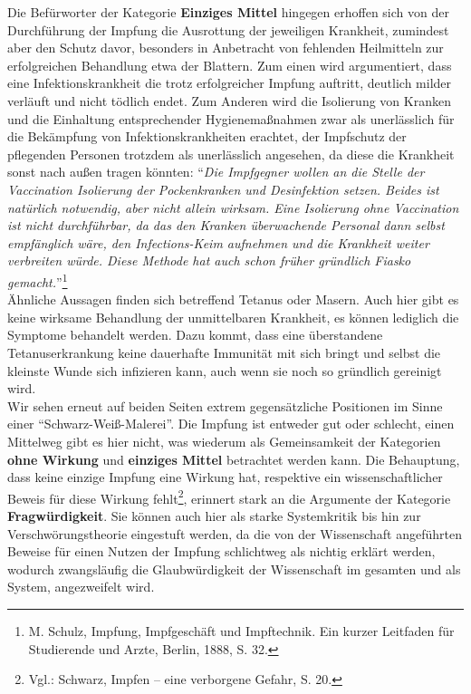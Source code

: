 \documentclass[
    a4paper,
    12pt,
    hyphens,
    chapterprefix=true,
    headheight=33pt,
    footheight=29pt,
    headings=optiontohead,
]{scrartcl}
\begin{document}
{Die Befürworter der Kategorie \textbf{Einziges Mittel} hingegen erhoffen sich von der Durchführung der Impfung die Ausrottung der jeweiligen Krankheit, zumindest aber den Schutz davor, besonders in Anbetracht von fehlenden Heilmitteln zur erfolgreichen Behandlung etwa der Blattern. Zum einen wird argumentiert, dass eine Infektionskrankheit die trotz erfolgreicher Impfung auftritt, deutlich milder verläuft und nicht tödlich endet. Zum Anderen wird die Isolierung von Kranken und die Einhaltung entsprechender Hygienemaßnahmen zwar als unerlässlich für die Bekämpfung von Infektionskrankheiten erachtet, der Impfschutz der pflegenden Personen trotzdem als unerlässlich angesehen, da diese die Krankheit sonst nach außen tragen könnten: "`\textit{Die Impfgegner wollen an die Stelle der Vaccination Isolierung der Pockenkranken und Desinfektion setzen. Beides ist natürlich notwendig, aber nicht allein wirksam. Eine Isolierung ohne Vaccination ist nicht durchführbar, da das den Kranken überwachende Personal dann selbst empfänglich wäre, den Infections-Keim aufnehmen und die Krankheit weiter verbreiten würde. Diese Methode hat auch schon früher gründlich Fiasko gemacht.}"'\footnote{M. Schulz, Impfung, Impfgeschäft und Impftechnik. Ein kurzer Leitfaden für Studierende und Arzte, Berlin, 1888, S. 32.}\\
Ähnliche Aussagen finden sich betreffend Tetanus oder Masern. Auch hier gibt es keine wirksame Behandlung der unmittelbaren Krankheit, es können lediglich die Symptome behandelt werden. Dazu kommt, dass eine überstandene Tetanuserkrankung keine dauerhafte Immunität mit sich bringt und selbst die kleinste Wunde sich infizieren kann, auch wenn sie noch so gründlich gereinigt wird.\\
Wir sehen erneut auf beiden Seiten extrem gegensätzliche Positionen im Sinne einer "`Schwarz-Weiß-Malerei"'. Die Impfung ist entweder gut oder schlecht, einen Mittelweg gibt es hier nicht, was wiederum als Gemeinsamkeit der Kategorien \textbf{ohne Wirkung} und \textbf{einziges Mittel} betrachtet werden kann. Die Behauptung, dass keine einzige Impfung eine Wirkung hat, respektive ein wissenschaftlicher Beweis für diese Wirkung fehlt\footnote{Vgl.: Schwarz, Impfen -- eine verborgene Gefahr, S. 20.}, erinnert stark an die Argumente der Kategorie \textbf{Fragwürdigkeit}. Sie können auch hier als starke Systemkritik bis hin zur Verschwörungstheorie eingestuft werden, da die von der Wissenschaft angeführten Beweise für einen Nutzen der Impfung schlichtweg als nichtig erklärt werden, wodurch zwangsläufig die Glaubwürdigkeit der Wissenschaft im gesamten und als System, angezweifelt wird.



}
\end{document}
